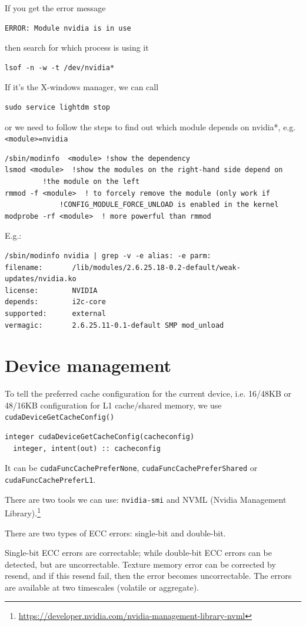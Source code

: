 If you get the error message 
\begin{verbatim}
ERROR: Module nvidia is in use
\end{verbatim}
then search for which process is using it
\begin{verbatim}
lsof -n -w -t /dev/nvidia*
\end{verbatim}
If it's the X-windows manager, we can call
\begin{verbatim}
sudo service lightdm stop
\end{verbatim}
or we need to follow the steps to find out which module depends on nvidia*, e.g.
\verb!<module>=nvidia!
\begin{verbatim}
/sbin/modinfo  <module> !show the dependency
lsmod <module>  !show the modules on the right-hand side depend on
         !the module on the left
rmmod -f <module>  ! to forcely remove the module (only work if
             !CONFIG_MODULE_FORCE_UNLOAD is enabled in the kernel
modprobe -rf <module>  ! more powerful than rmmod

\end{verbatim}
E.g.:
\begin{verbatim}
/sbin/modinfo nvidia | grep -v -e alias: -e parm:
filename:       /lib/modules/2.6.25.18-0.2-default/weak-updates/nvidia.ko
license:        NVIDIA
depends:        i2c-core
supported:      external
vermagic:       2.6.25.11-0.1-default SMP mod_unload
\end{verbatim}

\section{Device management}
\label{sec:device-management}

To tell the preferred cache configuration for the current device, i.e.
16/48KB or 48/16KB configuration for L1 cache/shared memory, we use
\verb!cudaDeviceGetCacheConfig()!
\begin{lstlisting}
integer cudaDeviceGetCacheConfig(cacheconfig)
  integer, intent(out) :: cacheconfig
\end{lstlisting}
It can be \verb!cudaFuncCachePreferNone!,
\verb!cudaFuncCachePreferShared! or \verb!cudaFuncCachePreferL1!. 

There are two tools we can use: \verb!nvidia-smi! and NVML (Nvidia Management
Library).\footnote{\url{https://developer.nvidia.com/nvidia-management-library-nvml}}

\begin{mdframed}
There are two types of ECC errors: single-bit and double-bit.

Single-bit ECC errors are correctable; while double-bit ECC errors can be
detected, but are uncorrectable. Texture memory error can be corrected by
resend, and if this resend fail, then the error becomes uncorrectable.  The
errors are available at two timescales (volatile or aggregate).

\end{mdframed}

